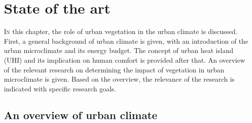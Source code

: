 \chapter{State of the art}
\label{ch:stateoftheart}
\def\figdir{chapters/ch02_stateoftheart/figures}
	
%		



\lettrine[lines=3,nindent=0em,loversize=0.1]{I}{n} this chapter, the role of urban vegetation in the urban climate is discussed. First, a general background of urban climate is given, with an introduction of the urban microclimate and its energy budget. The concept of urban heat island (UHI) and its implication on human comfort is provided after that. An overview of the relevant research on determining the impact of vegetation in urban microclimate is given. Based on the overview, the relevance of the research is indicated with specific research goals.


\section{An overview of urban climate}


